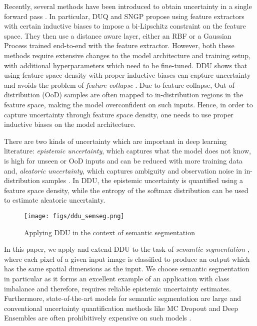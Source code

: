 \documentclass{article}
\begin{document}
Recently, several methods have been introduced to obtain uncertainty in a single forward pass \citep{van2020uncertainty, liu2020simple, mukhoti2021deterministic}.
In particular, DUQ \citep{van2020uncertainty} and SNGP \citep{liu2020simple} propose using feature extractors with certain inductive biases to impose a bi-Lipschitz constraint on the feature space. They then use a distance aware layer, either an RBF or a Gaussian Process trained end-to-end with the feature extractor. However, both these methods require extensive changes to the model architecture and training setup, with additional hyperparameters which need to be fine-tuned. DDU \citep{mukhoti2021deterministic} shows that using feature space density with proper inductive biases can capture uncertainty and avoids the problem of \emph{feature collapse} \citep{van2020uncertainty}. Due to feature collapse, Out-of-distribution (OoD) samples are often mapped to in-distribution regions in the feature space, making the model overconfident on such inputs.
Hence, in order to capture uncertainty through feature space density, one needs to use proper inductive biases on the model architecture.

There are two kinds of uncertainty which are important in deep learning literature: \emph{epistemic uncertainty}, which captures what the model does not know, is high for unseen or OoD inputs and can be reduced with more training data and, \emph{aleatoric uncertainty}, which captures ambiguity and observation noise in in-distribution samples \citep{kendall2017uncertainties}. In DDU, the epistemic uncertainty is quantified using a feature space density, while the entropy of the softmax distribution can be used to estimate aleatoric uncertainty.

\begin{figure*}[t]
    \centering
    \texttt{[image: figs/ddu\_semseg.png]}
    \caption{Applying DDU in the context of semantic segmentation}
    \label{fig:ddu_semsegs}
\end{figure*}

In this paper, we apply and extend DDU to the task of \emph{semantic segmentation} \citep{long2015fully}, where each pixel of a given input image is classified to produce an output which has the same spatial dimensions as the input. We choose semantic segmentation in particular as it forms an excellent example of an application with class imbalance and therefore, requires reliable epistemic uncertainty estimates. Furthermore, state-of-the-art models for semantic segmentation \citep{chen2017rethinking, zhao2017pyramid, wang2020deep} are large and conventional uncertainty quantification methods like MC Dropout \citep{gal2016dropout} and Deep Ensembles \citep{deep_ensembles} are often prohibitively expensive on such models \citep{kendall2015bayesian, mukhoti2018evaluating}.
\end{document}
